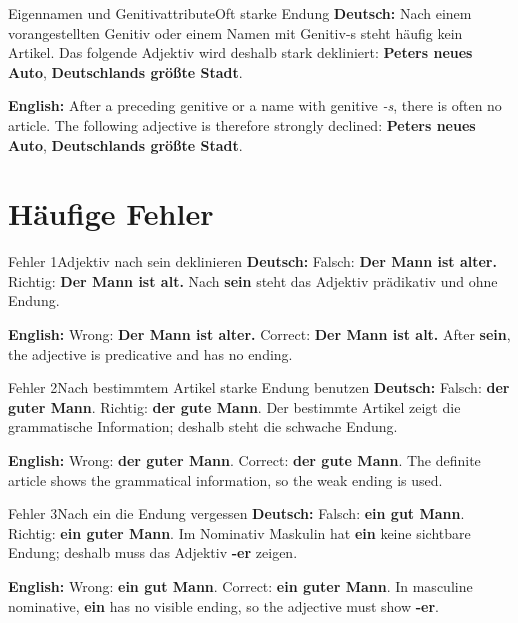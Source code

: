 \documentclass[a4paper,11pt]{article}
\newcommand{\GermanText}[1]{\textbf{Deutsch: }#1\par}
\newcommand{\EnglishText}[1]{{\small\color{SoftGray}\textbf{English: }#1\par}}
\begin{document}
        \begin{grammarentry}{Eigennamen und Genitivattribute}{Oft starke Endung}
            \GermanText{Nach einem vorangestellten Genitiv oder einem Namen mit Genitiv-s steht häufig kein Artikel. Das folgende Adjektiv wird deshalb stark dekliniert: \textbf{Peters neues Auto}, \textbf{Deutschlands größte Stadt}.}
            \EnglishText{After a preceding genitive or a name with genitive \textit{-s}, there is often no article. The following adjective is therefore strongly declined: \textbf{Peters neues Auto}, \textbf{Deutschlands größte Stadt}.}
        \end{grammarentry}

    \section{Häufige Fehler}

        \begin{grammarentry}{Fehler 1}{Adjektiv nach sein deklinieren}
            \GermanText{Falsch: \textbf{Der Mann ist alter.} Richtig: \textbf{Der Mann ist alt.} Nach \textbf{sein} steht das Adjektiv prädikativ und ohne Endung.}
            \EnglishText{Wrong: \textbf{Der Mann ist alter.} Correct: \textbf{Der Mann ist alt.} After \textbf{sein}, the adjective is predicative and has no ending.}
        \end{grammarentry}

        \begin{grammarentry}{Fehler 2}{Nach bestimmtem Artikel starke Endung benutzen}
            \GermanText{Falsch: \textbf{der guter Mann}. Richtig: \textbf{der gute Mann}. Der bestimmte Artikel zeigt die grammatische Information; deshalb steht die schwache Endung.}
            \EnglishText{Wrong: \textbf{der guter Mann}. Correct: \textbf{der gute Mann}. The definite article shows the grammatical information, so the weak ending is used.}
        \end{grammarentry}

        \begin{grammarentry}{Fehler 3}{Nach ein die Endung vergessen}
            \GermanText{Falsch: \textbf{ein gut Mann}. Richtig: \textbf{ein guter Mann}. Im Nominativ Maskulin hat \textbf{ein} keine sichtbare Endung; deshalb muss das Adjektiv \textbf{-er} zeigen.}
            \EnglishText{Wrong: \textbf{ein gut Mann}. Correct: \textbf{ein guter Mann}. In masculine nominative, \textbf{ein} has no visible ending, so the adjective must show \textbf{-er}.}
        \end{grammarentry}
\end{document}
